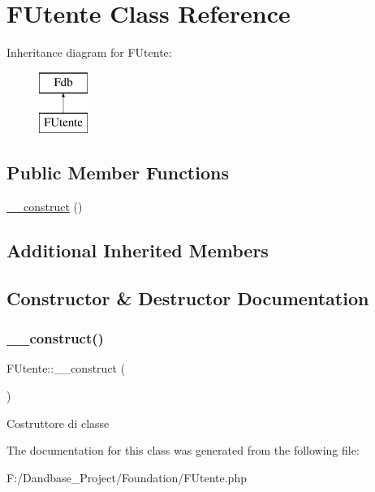 \hypertarget{class_f_utente}{}\section{F\+Utente Class Reference}
\label{class_f_utente}
Inheritance diagram for F\+Utente\+:\begin{figure}[H]
\begin{center}
\leavevmode
\includegraphics[height=2.000000cm]{class_f_utente}
\end{center}
\end{figure}
\subsection*{Public Member Functions}
\begin{DoxyCompactItemize}
\item 
\mbox{\hyperlink{class_f_utente_ae3bd9432a83c92db7086f3d3a640cd57}{\+\_\+\+\_\+construct}} ()
\end{DoxyCompactItemize}
\subsection*{Additional Inherited Members}


\subsection{Constructor \& Destructor Documentation}
\mbox{\label{class_f_utente_ae3bd9432a83c92db7086f3d3a640cd57}} 
\subsubsection{\texorpdfstring{\+\_\+\+\_\+construct()}{\_\_construct()}}
{\footnotesize\ttfamily F\+Utente\+::\+\_\+\+\_\+construct (\begin{DoxyParamCaption}{ }\end{DoxyParamCaption})}

Costruttore di classe 

The documentation for this class was generated from the following file\+:\begin{DoxyCompactItemize}
\item 
F\+:/\+Dandbase\+\_\+\+Project/\+Foundation/F\+Utente.\+php\end{DoxyCompactItemize}
